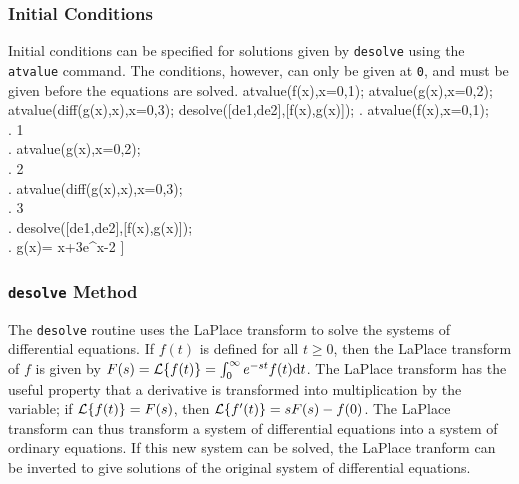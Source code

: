 \documentclass{article}
\begin{document}
\subsubsection{Initial Conditions}

Initial conditions can be specified for solutions given by
\texttt{desolve} using the \texttt{atvalue} command.
The conditions, however, can only be given at \texttt{0}, and
must be given before the equations are solved.
\beginmaximasession
atvalue(f(x),x=0,1);
atvalue(g(x),x=0,2);
atvalue(diff(g(x),x),x=0,3);
desolve([de1,de2],[f(x),g(x)]);
\maximatexsession
{}.  atvalue(f(x),x=0,1); \\
.   1 \\
.  atvalue(g(x),x=0,2); \\
.   2 \\
.  atvalue(diff(g(x),x),x=0,3); \\
.   3 \\
.  desolve([de1,de2],[f(x),g(x)]); \\
.   \left[ f\left(x\right)=3\*e^{x}-2,\linebreak[0]g\left(x\right)=
 \cos x+3\*e^{x}-2 \right]  \\
\endmaximasession

\subsubsection{\texttt{desolve} Method}

The \texttt{desolve} routine uses the LaPlace transform to solve the
systems of differential equations.
If $f(t)$ is defined for all $t \ge 0$, then the LaPlace transform of
$f$ is given by $F(s)={\cal L}\{f(t)\} = \int_0^\infty
e^{-st}f(t)\textrm{d}t$.   The LaPlace transform has the useful
property that a derivative is transformed into multiplication by the
variable; if ${\cal L}\{f(t)\} = F(s)$, then 
${\cal L}\{f'(t)\} = sF(s)-f(0)$.  The LaPlace transform can thus
transform a system of differential equations into a system of ordinary
equations.  If this new system can be solved, the LaPlace
tranform can be inverted to give solutions of the original system of
differential equations.
\end{document}
